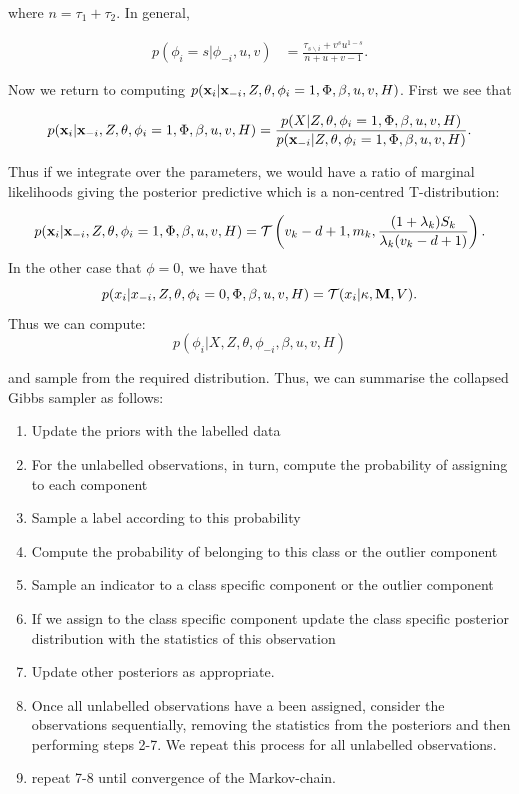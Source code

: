 \documentclass[12pt,english]{article}\usepackage[]{graphicx}\usepackage[]{color}
\begin{document}
where $n = \tau_1 + \tau_2$. In general,

\begin{equation}
\begin{split}
p(\phi_i=s|\phi_{-i},u,v) &=  \frac{\tau_{s\backslash i} + v^{s}u^{1-s}}{n+u+v-1}.
\end{split}
\end{equation}

Now we return to computing
$p({\bf x}_i|{\bf x}_{-i},Z,\theta, \phi_i =1, \Phi, \beta, u,v,
H)$. First we see that

\begin{equation}
p({\bf x}_i|{\bf x}_{-i},Z,\theta, \phi_i =1, \Phi, \beta, u,v, H)= \frac{p(X|Z,\theta, \phi_i =1, \Phi, \beta, u,v, H)}{p({\bf x}_{-i}|Z,\theta, \phi_i =1, \Phi, \beta, u,v, H)}.
\end{equation}

Thus if we integrate over the parameters, we would have a ratio of
marginal likelihoods giving the posterior predictive which is a
non-centred T-distribution:

\begin{equation}
p({\bf x}_i|{\bf x}_{-i},Z,\theta, \phi_i =1, \Phi, \beta, u,v, H) = \mathcal{T}\left( v_k - d + 1, m_k, \frac{(1+\lambda_k)S_k}{\lambda_k (v_k - d + 1)} \right).
\end{equation}
In the other case that $\phi = 0$, we have that
\begin{equation}
p(x_i|x_{-i},Z,\theta, \phi_i =0, \Phi, \beta, u,v, H) = \mathcal{T}(x_i|\kappa, {\bf M}, V).
\end{equation}
Thus we can compute:
\begin{equation}
p(\phi_i|X,Z,\theta, \phi_{-i}, \beta, u,v, H)
\end{equation}

and sample from the required distribution. Thus, we can summarise the
collapsed Gibbs sampler as follows:

\begin{enumerate}
\item Update the priors with the labelled data
\item For the unlabelled observations, in turn, compute the
  probability of assigning to each component
\item Sample a label according to this probability
\item Compute the probability of belonging to this class or the
  outlier component
\item Sample an indicator to a class specific component or the outlier
  component
\item If we assign to the class specific component update the class
  specific posterior distribution with the statistics of this
  observation
\item Update other posteriors as appropriate.
\item Once all unlabelled observations have a been assigned, consider
  the observations sequentially, removing the statistics from the
  posteriors and then performing steps 2-7. We repeat this process for
  all unlabelled observations.
\item repeat 7-8 until convergence of the Markov-chain.
\end{enumerate}
\end{document}
